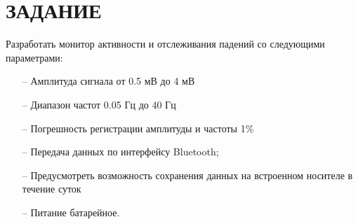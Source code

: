 \begin{sloppypar} %
\newpage %
\section*{ЗАДАНИЕ} %

Разработать монитор активности и отслеживания падений  со следующими параметрами: 
\begin{itemize}
	\item[--]Амплитуда сигнала от 0.5 мВ до 4 мВ
	\item[--]Диапазон частот 0.05 Гц до 40 Гц
	\item[--]Погрешность регистрации амплитуды и частоты 1\%
	\item[--]Передача данных по интерфейсу Bluetooth;
	\item[--]Предусмотреть возможность сохранения данных на встроенном носителе в течение суток
	\item[--]Питание батарейное.
\end{itemize}
\end{sloppypar}